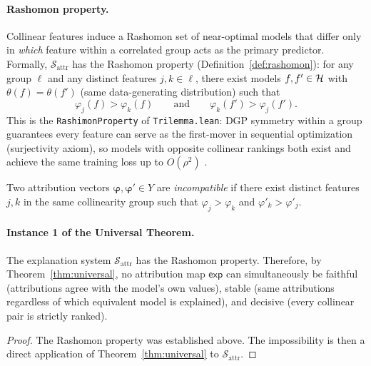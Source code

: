 \paragraph{Rashomon property.}
Collinear features induce a Rashomon set \citep{rudin2024amazing,fisher2019models,
damour2022underspecification} of near-optimal models that differ only in \emph{which}
feature within a correlated group acts as the primary predictor.
Formally, $\mathcal{S}_{\mathrm{attr}}$ has the Rashomon property
(Definition~\ref{def:rashomon}): for any group $\ell$ and any distinct features
$j, k \in \ell$, there exist models $f, f' \in \mathcal{H}$ with $\theta(f) = \theta(f')$ (same
data-generating distribution) such that
\[
  \varphi_j(f) > \varphi_k(f) \qquad \text{and} \qquad
  \varphi_k(f') > \varphi_j(f').
\]
This is the \texttt{RashimonProperty} of \texttt{Trilemma.lean}: DGP symmetry within a
group guarantees every feature can serve as the first-mover in sequential optimization
(surjectivity axiom), so models with opposite collinear rankings both exist and achieve
the same training loss up to $O(\rho^2)$ \citep{damour2022underspecification,fisher2019models}.

\begin{definition}
\label{def:attr-incompatible}
Two attribution vectors $\boldsymbol{\varphi}, \boldsymbol{\varphi}' \in Y$ are
\emph{incompatible} if there exist distinct features $j, k$ in the same collinearity
group such that $\varphi_j > \varphi_k$ and $\varphi'_k > \varphi'_j$.
\end{definition}

\paragraph{Instance 1 of the Universal Theorem.}

\begin{corollary}
\label{cor:attribution}
The explanation system $\mathcal{S}_{\mathrm{attr}}$ has the Rashomon property.
Therefore, by Theorem~\ref{thm:universal}, no attribution map $\mathsf{exp}$ can
simultaneously be faithful (attributions agree with the model's own values), stable
(same attributions regardless of which equivalent model is explained), and decisive
(every collinear pair is strictly ranked).
\end{corollary}

\begin{proof}
The Rashomon property was established above.  The impossibility is then a direct
application of Theorem~\ref{thm:universal} to $\mathcal{S}_{\mathrm{attr}}$.
\end{proof}

